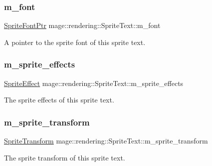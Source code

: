 \subsubsection{\texorpdfstring{m\+\_\+font}{m\_font}}
{\footnotesize\ttfamily \hyperlink{namespacemage_1_1rendering_ab2f34196c20422ca3692ad3f3bff3a5d}{Sprite\+Font\+Ptr} mage\+::rendering\+::\+Sprite\+Text\+::m\+\_\+font\hspace{0.3cm}{\ttfamily [private]}}

A pointer to the sprite font of this sprite text. \hypertarget{classmage_1_1rendering_1_1_sprite_text_a49995d4b435446b48d2d112113834f23}{}\label{classmage_1_1rendering_1_1_sprite_text_a49995d4b435446b48d2d112113834f23} 
\subsubsection{\texorpdfstring{m\+\_\+sprite\+\_\+effects}{m\_sprite\_effects}}
{\footnotesize\ttfamily \hyperlink{namespacemage_1_1rendering_a4dbc3536c87b906f1d41d863ec458e78}{Sprite\+Effect} mage\+::rendering\+::\+Sprite\+Text\+::m\+\_\+sprite\+\_\+effects\hspace{0.3cm}{\ttfamily [private]}}

The sprite effects of this sprite text. \hypertarget{classmage_1_1rendering_1_1_sprite_text_af702fbdab6468fbd5856434192a32787}{}\label{classmage_1_1rendering_1_1_sprite_text_af702fbdab6468fbd5856434192a32787} 
\subsubsection{\texorpdfstring{m\+\_\+sprite\+\_\+transform}{m\_sprite\_transform}}
{\footnotesize\ttfamily \hyperlink{classmage_1_1_sprite_transform}{Sprite\+Transform} mage\+::rendering\+::\+Sprite\+Text\+::m\+\_\+sprite\+\_\+transform\hspace{0.3cm}{\ttfamily [private]}}

The sprite transform of this sprite text. \hypertarget{classmage_1_1rendering_1_1_sprite_text_a2f9d4a00ad08710fe36eebd825b2f142}{}\label{classmage_1_1rendering_1_1_sprite_text_a2f9d4a00ad08710fe36eebd825b2f142} 
